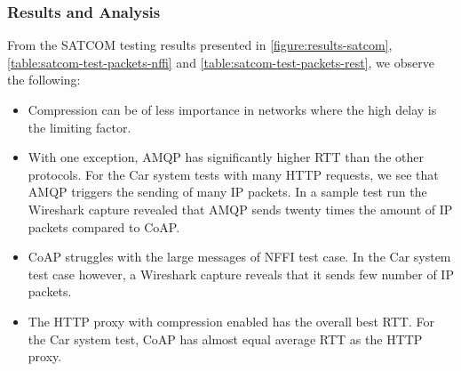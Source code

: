 \subsubsection{Results and Analysis}

From the SATCOM testing results presented in \cref{figure:results-satcom},
\cref{table:satcom-test-packets-nffi} and \cref{table:satcom-test-packets-rest},
we observe the following:

\begin{itemize}

    \item Compression can be of less importance in networks where the high delay
    is the limiting factor.

    \item With one exception, AMQP has significantly higher RTT than the other
    protocols. For the Car system tests with many HTTP requests, we see that
    AMQP triggers the sending of many IP packets. In a sample test run the
    Wireshark capture revealed that AMQP sends twenty times the amount of IP packets
    compared to CoAP.

    \item CoAP struggles with the large messages of NFFI test case. In the Car
    system test case however, a Wireshark capture reveals that it sends few number of IP
    packets.

    \item The HTTP proxy with compression enabled has the overall best RTT. For
    the Car system test, CoAP has almost equal average RTT as the HTTP proxy.

\end{itemize}

